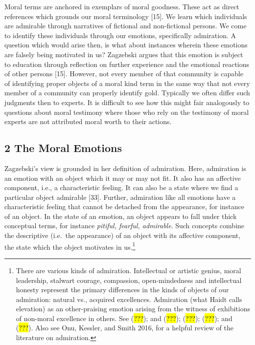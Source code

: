 \documentclass[
  letterpaper,
  DIV=11,
  numbers=noendperiod]{scrartcl}
\theoremstyle{remark}
\begin{document}
Moral terms are anchored in exemplars of moral goodness. These act as
direct references which grounds our moral terminology {[}15{]}. We learn
which individuals are admirable through narratives of fictional and
non-fictional persons. We come to identify these individuals through our
emotions, specifically admiration. A question which would arise then, is
what about instances wherein these emotions are falsely being motivated
in us? Zagzebski argues that this emotion is subject to education
through reflection on further experience and the emotional reactions of
other persons {[}15{]}. However, not every member of that community is
capable of identifying proper objects of a moral kind term in the same
way that not every member of a community can properly identify gold.
Typically we often differ such judgments then to experts. It is
difficult to see how this might fair analogously to questions about
moral testimony where those who rely on the testimony of moral experts
are not attributed moral worth to their actions.

\subsection{2 The Moral Emotions}\label{the-moral-emotions}

Zagzebski's view is grounded in her definition of admiration. Here,
admiration is an emotion with an object which it may or may not fit. It
also has an affective component, i.e., a characteristic feeling. It can
also be a state where we find a particular object admirable {[}33{]}.
Further, admiration like all emotions have a characteristic feeling that
cannot be detached from the appearance, for instance of an object. In
the state of an emotion, an object appears to fall under thick
conceptual terms, for instance \emph{pitiful, fearful, admirable}. Such
concepts combine the descriptive (i.e.~the appearance) of an object with
its affective component, the state which the object motivates in
us.\footnote{There are various kinds of admiration. Intellectual or
  artistic genius, moral leadership, stalwart courage, compassion,
  open-mindedness and intellectual honesty represent the primary
  differences in the kinds of objects of our admiration: natural vs.,
  acquired excellences. Admiration (what Haidt calls elevation) as an
  other-praising emotion arising from the witness of exhibitions of
  non-moral excellence in others. See (\hl{???}); and (\hl{???});
  (\hl{???}); (\hl{???}); and (\hl{???}). Also see Onu, Kessler, and
  Smith 2016, for a helpful review of the literature on admiration.}
\end{document}
